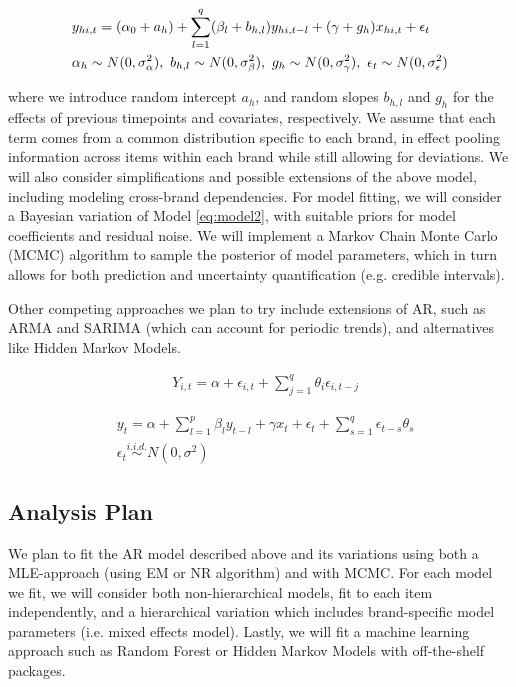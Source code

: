 \documentclass{article}
\begin{document}
\begin{align}
    & y_{hi,t} = (\alpha_0+a_h)+\sum_{l=1}^q (\beta_l+b_{h,l}) y_{hi,t-l} + (\gamma+g_h) x_{hi,t} + \epsilon_{t}     \label{eq:model2} \\
    & \alpha_h \sim N(0,\sigma_{\alpha}^2), \ b_{h,l} \sim N(0,\sigma_{\beta}^2), \ g_h \sim N(0,\sigma_{\gamma}^2), \ \epsilon_t \sim N(0,\sigma_{\epsilon}^2) \notag
\end{align}

\noindent where we introduce random intercept $a_h$, and random slopes $b_{h,l}$ and $g_h$ for the effects of previous timepoints and covariates, respectively. We assume that each term comes from a common distribution specific to each brand, in effect pooling information across items within each brand while still allowing for deviations. We will also consider simplifications and possible extensions of the above model, including modeling cross-brand dependencies. For model fitting, we will consider a Bayesian variation of Model \ref{eq:model2}, with suitable priors for model coefficients and residual noise. We will implement a Markov Chain Monte Carlo (MCMC) algorithm to sample the posterior of model parameters, which in turn allows for both prediction and uncertainty quantification (e.g. credible intervals).


Other competing approaches we plan to try include extensions of AR, such as ARMA and SARIMA (which can account for periodic trends), and alternatives like Hidden Markov Models.

\vspace{0.5cm}

\begin{align*}
   & Y_{i,t} = \alpha + \epsilon_{i,t} +\sum_{j=1}^q\theta_i\epsilon_{i,t-j}
\end{align*}

\begin{align*}
    & y_t = \alpha + \sum_{l=1}^p\beta_l y_{t-l} + \gamma x_t+ \epsilon_t +\sum_{s=1}^q \epsilon_{t-s} \theta_{s}
    \\ &\epsilon_t\overset{i.i.d.}{\sim} N(0,\sigma^2)
\end{align*}






\vspace{1cm}

\subsection*{Analysis Plan}
\noindent We plan to fit the AR model described above and its variations using both a MLE-approach (using EM or NR algorithm) and with MCMC. For each model we fit, we will consider both non-hierarchical models, fit to each item independently, and a hierarchical variation which includes brand-specific model parameters (i.e. mixed effects model). Lastly, we will fit a machine learning approach such as Random Forest or Hidden Markov Models with off-the-shelf packages. 
\end{document}
